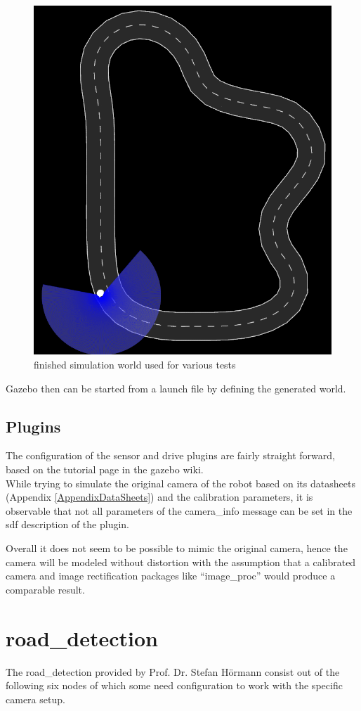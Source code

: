 \begin{figure}
	\centering
	\includegraphics[width=.5\textwidth]{Pictures/test track}
	\caption{finished simulation world used for various tests}
	\label{simworld}
\end{figure}

Gazebo then can be started from a launch file by defining the generated world.\\

\subsection{Plugins}
The configuration of the sensor and drive plugins are fairly straight forward, based on the tutorial page in the gazebo wiki\cite{gazebotutorial}.\\



While trying to simulate the original camera of the robot based on its datasheets (Appendix \ref{AppendixDataSheets}) and the calibration parameters, it is observable that not all parameters of the camera\_info message can be set in the sdf description of the plugin.

Overall it does not seem to be possible to mimic the original camera, hence the camera will be modeled without distortion with the assumption that a calibrated camera and image rectification packages like ``image\_proc'' would produce a comparable result.






\section{road\_detection}
The road\_detection provided by Prof. Dr. Stefan Hörmann consist out of the following six nodes of which some need configuration to work with the specific camera setup.

